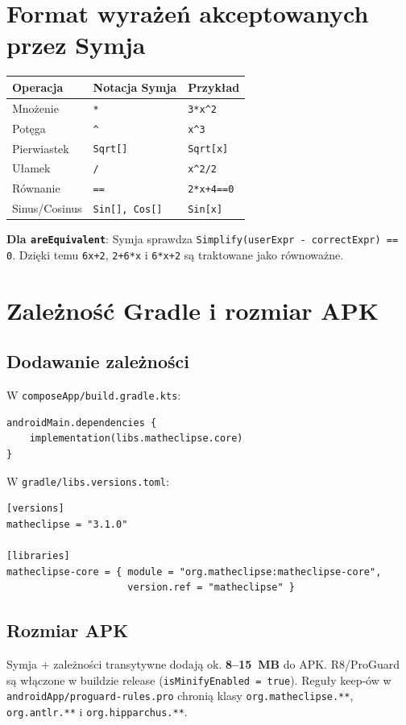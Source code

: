 \documentclass[11pt,a4paper]{article}
\begin{document}
\section{Format wyrażeń akceptowanych przez Symja}

\begin{center}
\begin{tabular}{lll}
\toprule
\textbf{Operacja} & \textbf{Notacja Symja} & \textbf{Przykład} \\
\midrule
Mnożenie & \texttt{*} & \texttt{3*x^2} \\
Potęga & \texttt{\textasciicircum} & \texttt{x\textasciicircum 3} \\
Pierwiastek & \texttt{Sqrt[]} & \texttt{Sqrt[x]} \\
Ułamek & \texttt{/} & \texttt{x\textasciicircum 2/2} \\
Równanie & \texttt{==} & \texttt{2*x+4==0} \\
Sinus/Cosinus & \texttt{Sin[], Cos[]} & \texttt{Sin[x]} \\
\bottomrule
\end{tabular}
\end{center}

\textbf{Dla \texttt{areEquivalent}}: Symja sprawdza \texttt{Simplify(userExpr - correctExpr) == 0}.
Dzięki temu \texttt{6x+2}, \texttt{2+6*x} i \texttt{6*x+2} są traktowane jako równoważne.

\section{Zależność Gradle i rozmiar APK}

\subsection{Dodawanie zależności}

W \texttt{composeApp/build.gradle.kts}:
\begin{lstlisting}
androidMain.dependencies {
    implementation(libs.matheclipse.core)
}
\end{lstlisting}

W \texttt{gradle/libs.versions.toml}:
\begin{lstlisting}
[versions]
matheclipse = "3.1.0"

[libraries]
matheclipse-core = { module = "org.matheclipse:matheclipse-core",
                     version.ref = "matheclipse" }
\end{lstlisting}

\subsection{Rozmiar APK}

Symja + zależności transytywne dodają ok. \textbf{8--15~MB} do APK.
R8/ProGuard są włączone w buildzie release (\texttt{isMinifyEnabled = true}).
Reguły keep-ów w \texttt{androidApp/proguard-rules.pro} chronią klasy
\texttt{org.matheclipse.**}, \texttt{org.antlr.**} i \texttt{org.hipparchus.**}.
\end{document}
